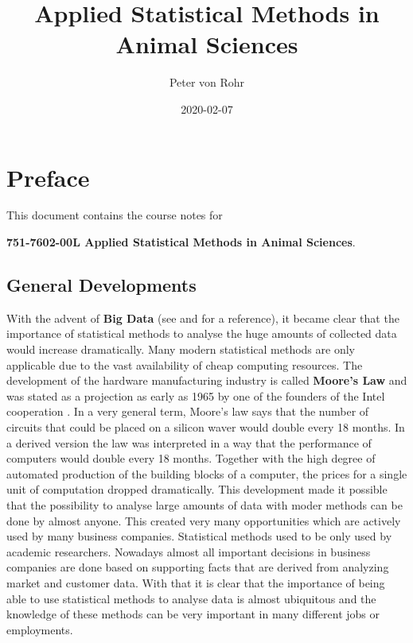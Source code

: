 \documentclass[]{book}
\title{Applied Statistical Methods in Animal Sciences}
\author{Peter von Rohr}
\date{2020-02-07}
\theoremstyle{definition}
\theoremstyle{definition}
\theoremstyle{definition}
\theoremstyle{remark}
\begin{document}
\maketitle

{
\setcounter{tocdepth}{1}
\tableofcontents
}
\hypertarget{preface}{%
\chapter*{Preface}\label{preface}}

This document contains the course notes for

\textbf{751-7602-00L Applied Statistical Methods in Animal Sciences}.

\hypertarget{general-developments}{%
\section*{General Developments}\label{general-developments}}

With the advent of \textbf{Big Data} (see \citep{Wikipedia2019} and \citep{Mashey1998} for a reference), it became clear that the importance of statistical methods to analyse the huge amounts of collected data would increase dramatically. Many modern statistical methods are only applicable due to the vast availability of cheap computing resources. The development of the hardware manufacturing industry is called \textbf{Moore's Law} and was stated as a projection as early as 1965 by one of the founders of the Intel cooperation \citep{Moore1965}. In a very general term, Moore's law says that the number of circuits that could be placed on a silicon waver would double every 18 months. In a derived version the law was interpreted in a way that the performance of computers would double every 18 months. Together with the high degree of automated production of the building blocks of a computer, the prices for a single unit of computation dropped dramatically. This development made it possible that the possibility to analyse large amounts of data with moder methods can be done by almost anyone. This created very many opportunities which are actively used by many business companies. Statistical methods used to be only used by academic researchers. Nowadays almost all important decisions in business companies are done based on supporting facts that are derived from analyzing market and customer data. With that it is clear that the importance of being able to use statistical methods to analyse data is almost ubiquitous and the knowledge of these methods can be very important in many different jobs or employments.
\end{document}
